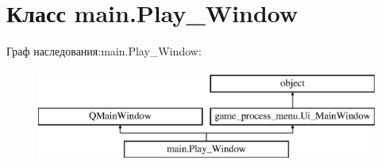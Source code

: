 \hypertarget{classmain_1_1_play___window}{}\section{Класс main.\+Play\+\_\+\+Window}
\label{classmain_1_1_play___window}
Граф наследования\+:main.\+Play\+\_\+\+Window\+:\begin{figure}[H]
\begin{center}
\leavevmode
\includegraphics[height=3.000000cm]{classmain_1_1_play___window}
\end{center}
\end{figure}
